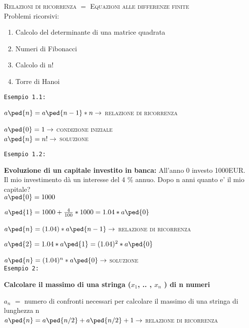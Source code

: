 \documentclass[12pt,a4paper]{article}
\begin{document}
\textsc{Relazioni di ricorrenza $=$ Equazioni alle differenze finite}
 \\

Problemi ricorsivi:
\begin{enumerate}
\item Calcolo del determinante di una matrice quadrata
\item Numeri di Fibonacci
\item Calcolo di n!
\item Torre di Hanoi
\end{enumerate} 

\par
\texttt{Esempio 1.1:} \par
    \(a\ped{n} = a\ped{n-1} * n \rightarrow \) \textsc{relazione di ricorrenza} \par
    \(a\ped{0} = 1 \rightarrow \) \textsc{condizione iniziale} \\

    \( a\ped{n} = n! \rightarrow \) \textsc{soluzione} \\

\par
\texttt{Esempio 1.2:} \par
\textbf{Evoluzione di un capitale investito in banca:}  All'anno 0 investo 1000EUR. Il mio investimento dà un interesse del 4 \% annuo. Dopo n anni quanto e' il mio capitale? \\

\(a\ped{0} = 1000 \) \par
\(a\ped{1} = 1000 + \frac{4}{100} * 1000 = 1.04 * a\ped{0} \) \par
\(a\ped{n} = (1.04) * a\ped{n-1} \rightarrow \) \textsc{relazione di ricorrenza} \par

\(a\ped{2} = 1.04 * a\ped{1} = (1.04)^2 * a\ped{0} \) \par

\(a\ped{n} = (1.04)^n * a\ped{0} \rightarrow \) \textsc{soluzione} 
\\

\texttt{Esempio 2:} \par
\textbf{Calcolare il massimo di una stringa ($x_1$, .. , $x_n$ ) di n numeri} \par

$a_n$ $=$ numero di confronti necessari per calcolare il massimo di una stringa di lunghezza n \\

\( a\ped{n} = a\ped{n/2} + a\ped{n/2} +1 \rightarrow \) \textsc{relazione di ricorrenza} \par
\end{document}
